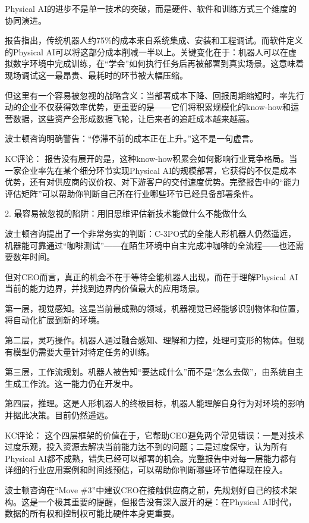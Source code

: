 \documentclass[11pt]{ctexart}
\begin{document}
Physical AI的进步不是单一技术的突破，而是硬件、软件和训练方式三个维度的协同演进。

报告指出，传统机器人约75\%的成本来自系统集成、安装和工程调试。而软件定义的Physical AI可以将这部分成本削减一半以上。关键变化在于：机器人可以在虚拟数字环境中完成训练，在“学会”如何执行任务后再被部署到真实场景。这意味着现场调试这一最昂贵、最耗时的环节被大幅压缩。

但这里有一个容易被忽视的战略含义：当部署成本下降、回报周期缩短时，率先行动的企业不仅获得效率优势，更重要的是——它们将积累规模化的know-how和运营数据，这些资产会形成数据飞轮，让后来者的追赶成本越来越高。

波士顿咨询明确警告：“停滞不前的成本正在上升。”这不是一句虚言。

KC评论： 报告没有展开的是，这种know-how积累会如何影响行业竞争格局。当一家企业率先在某个细分环节实现Physical AI的规模部署，它获得的不仅是成本优势，还有对供应商的议价权、对下游客户的交付速度优势。完整报告中的“能力评估矩阵”可以帮助你判断自己所在行业哪些环节已经具备部署条件。

2. 最容易被忽视的陷阱：用旧思维评估新技术能做什么不能做什么

波士顿咨询提出了一个非常务实的判断：C-3PO式的全能人形机器人仍然遥远，机器能可靠通过“咖啡测试”——在陌生环境中自主完成冲咖啡的全流程——也还需要数年时间。

但对CEO而言，真正的机会不在于等待全能机器人出现，而在于理解Physical AI当前的能力边界，并找到边界内价值最大的应用场景。

第一层，视觉感知。这是当前最成熟的领域，机器视觉已经能够识别物体和位置，将自动化扩展到新的环境。

第二层，灵巧操作。机器人通过融合感知、理解和力控，处理可变形的物体。但现有模型仍需要大量针对特定任务的训练。

第三层，工作流规划。机器人被告知“要达成什么”而不是“怎么去做”，由系统自主生成工作流。这一能力仍在开发中。

第四层，推理。这是人形机器人的终极目标，机器人能理解自身行为对环境的影响并据此决策。目前仍然遥远。

KC评论： 这个四层框架的价值在于，它帮助CEO避免两个常见错误：一是对技术过度乐观，投入资源去解决当前能力达不到的问题；二是过度保守，认为所有Physical AI都不成熟，错失已经可以部署的机会。完整报告中对每一层能力都有详细的行业应用案例和时间线预估，可以帮助你判断哪些环节值得现在投入。

波士顿咨询在“Move \#3”中建议CEO在接触供应商之前，先规划好自己的技术架构。这是一个极其重要的提醒，但报告没有深入展开的是：在Physical AI时代，数据的所有权和控制权可能比硬件本身更重要。
\end{document}
